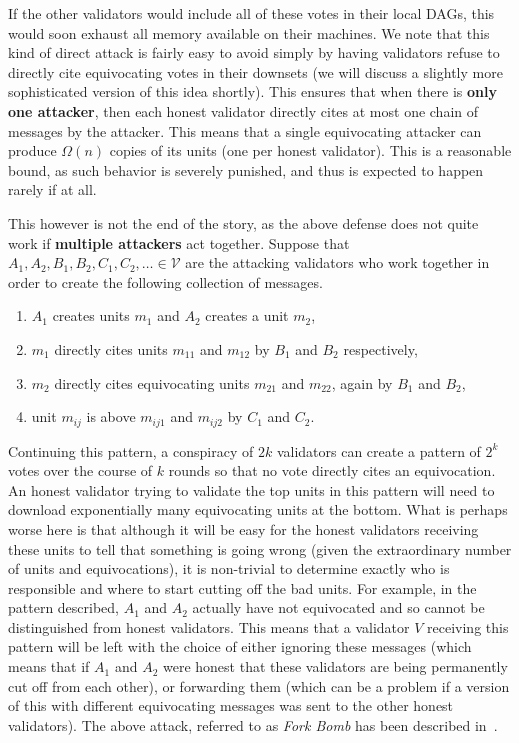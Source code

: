 \documentclass[12pt, fleqn]{article}
\newcommand{\cV}{\mathcal{V}}
\begin{document}
%
If the other validators would include all of these votes in their local DAGs, this would soon exhaust all memory available on their machines.
%
We note that this kind of direct attack is fairly easy to avoid simply by having validators refuse to directly cite equivocating votes in their downsets (we will discuss a slightly more sophisticated version of this idea shortly).
%
This ensures that when there is {\bf only one attacker}, then each honest validator directly cites at most one chain of messages by the attacker.
%
This means that a single equivocating attacker can produce $\Omega(n)$ copies of its units (one per honest validator).
%
This is a reasonable bound, as such behavior is severely punished, and thus is expected to happen rarely if at all.

This however is not the end of the story, as the above defense does not quite work if {\bf multiple attackers} act together.
%
Suppose that $A_1,A_2,B_1,B_2,C_1,C_2,\ldots \in \cV$ are the attacking validators who work together in order to create the following collection of messages. 
\begin{enumerate}
    \item $A_1$ creates units $m_1$ and $A_2$ creates a unit $m_2$,
    \item $m_1$ directly cites units $m_{11}$ and $m_{12}$ by $B_1$ and $B_2$ respectively,
    \item $m_2$ directly cites equivocating units $m_{21}$ and $m_{22}$, again by $B_1$ and $B_2$,
    \item unit $m_{ij}$ is above $m_{ij1}$ and $m_{ij2}$ by $C_1$ and $C_2$.
\end{enumerate}
Continuing this pattern, a conspiracy of $2k$ validators can create a pattern of $2^k$ votes over the course of $k$ rounds so that no vote directly cites an equivocation.
%
An honest validator trying to validate the top units in this pattern will need to download exponentially many equivocating units at the bottom.
%
What is perhaps worse here is that although it will be easy for the honest validators receiving these units to tell that something is going wrong (given the extraordinary number of units and equivocations), it is non-trivial to determine exactly who is responsible and where to start cutting off the bad units.
%
For example, in the pattern described, $A_1$ and $A_2$ actually have not equivocated and so cannot be distinguished from honest validators.
%
This means that a validator $V$ receiving this pattern will be left with the choice of either ignoring these messages (which means that if $A_1$ and $A_2$ were honest that these validators are being permanently cut off from each other), or forwarding them (which can be a problem if a version of this with different equivocating messages was sent to the other honest validators).
%
The above attack, referred to as {\it Fork Bomb} has been described in~\cite{GLSS19}.
\end{document}
